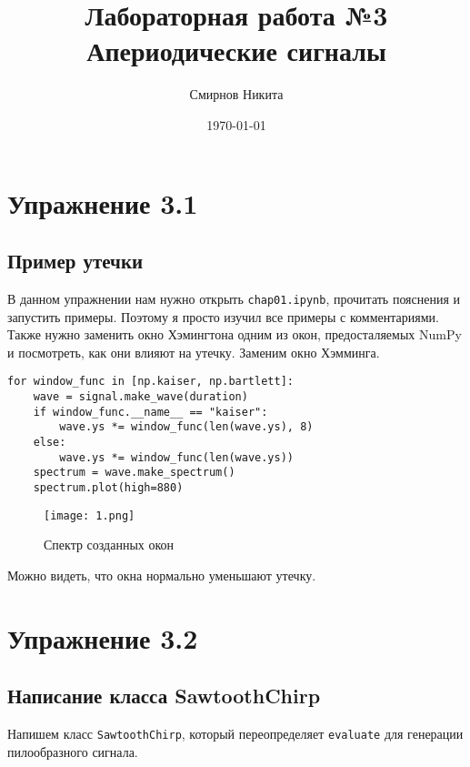 \documentclass[a4paper,12pt]{report}
\title{Лабораторная работа №3\\Апериодические сигналы}
\author{Смирнов Никита}
\date{\today}
\begin{document}
\maketitle
\tableofcontents
\listoffigures
\lstlistoflistings

\maketitle

\chapter{Упражнение 3.1}
\section{Пример утечки}

В данном упражнении нам нужно открыть \texttt{chap01.ipynb}, прочитать пояснения и  запустить примеры. Поэтому я просто изучил все примеры с комментариями. \\ Также нужно заменить окно Хэмингтона одним из окон, предосталяемых NumPy и посмотреть, как они влияют на утечку. Заменим окно Хэмминга.

\begin{lstlisting}[caption=Создание других окон]
for window_func in [np.kaiser, np.bartlett]:
    wave = signal.make_wave(duration)
    if window_func.__name__ == "kaiser":
        wave.ys *= window_func(len(wave.ys), 8)
    else:
        wave.ys *= window_func(len(wave.ys))
    spectrum = wave.make_spectrum()
    spectrum.plot(high=880)
\end{lstlisting}

\begin{figure}[H]
        \centering
        \texttt{[image: 1.png]}
        \caption{Спектр созданных окон}
        \label{fig:lab3_fig1}
\end{figure}

Можно видеть, что окна нормально уменьшают утечку.

\chapter{Упражнение 3.2}
\section{Написание класса SawtoothChirp}

Напишем класс \texttt{SawtoothChirp}, который переопределяет \texttt{evaluate} для генерации пилообразного сигнала.
\end{document}

